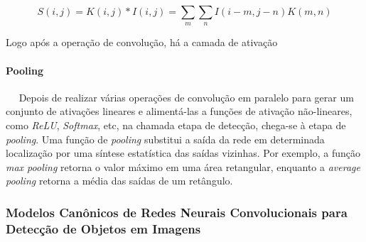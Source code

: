 \begin{equation}\label{eq:conv_img_eq}
	S(i,j) = K(i,j)*I(i,j) = \sum_{m}\sum_{n}I(i-m,j-n)K(m,n)
\end{equation}

Logo após a operação de convolução, há a camada de ativação
\paragraph{Pooling}
\ \ \newline
Depois de realizar várias operações de convolução em paralelo para gerar um conjunto de ativações lineares e alimentá-las a funções de ativação não-lineares, como \emph{ReLU}, \emph{Softmax}, etc, na chamada etapa de detecção, chega-se à etapa de \emph{pooling}. Uma função de \emph{pooling} substitui a saída da rede em determinada localização por uma síntese estatística das saídas vizinhas. Por exemplo, a função \emph{max pooling} retorna o valor máximo em uma área retangular, enquanto a \emph{average pooling} retorna a média das saídas de um retângulo. %


\subsubsection{Modelos Canônicos de Redes Neurais Convolucionais para Detecção de Objetos em Imagens} \label{subsubsec:modelos_canonicos}
